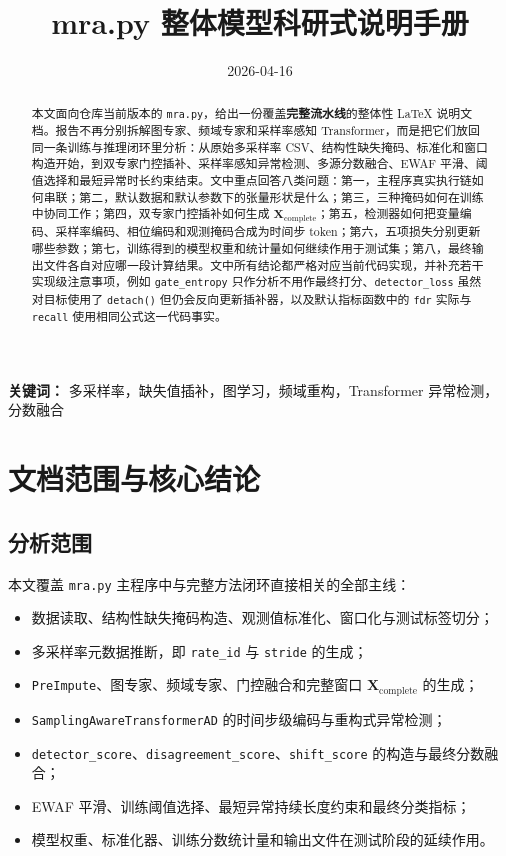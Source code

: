 \documentclass[UTF8]{ctexart}
\title{mra.py 整体模型科研式说明手册}
\author{}
\date{2026-04-16}
\newcommand{\code}[1]{\texttt{#1}}
\begin{document}
\maketitle

\begin{abstract}
本文面向仓库当前版本的 \code{mra.py}，给出一份覆盖\textbf{完整流水线}的整体性 LaTeX 说明文档。报告不再分别拆解图专家、频域专家和采样率感知 Transformer，而是把它们放回同一条训练与推理闭环里分析：从原始多采样率 CSV、结构性缺失掩码、标准化和窗口构造开始，到双专家门控插补、采样率感知异常检测、多源分数融合、EWAF 平滑、阈值选择和最短异常时长约束结束。文中重点回答八类问题：第一，主程序真实执行链如何串联；第二，默认数据和默认参数下的张量形状是什么；第三，三种掩码如何在训练中协同工作；第四，双专家门控插补如何生成 \(\bm{X}_{\text{complete}}\)；第五，检测器如何把变量编码、采样率编码、相位编码和观测掩码合成为时间步 token；第六，五项损失分别更新哪些参数；第七，训练得到的模型权重和统计量如何继续作用于测试集；第八，最终输出文件各自对应哪一段计算结果。文中所有结论都严格对应当前代码实现，并补充若干实现级注意事项，例如 \code{gate\_entropy} 只作分析不用作最终打分、\code{detector\_loss} 虽然对目标使用了 \code{detach()} 但仍会反向更新插补器，以及默认指标函数中的 \code{fdr} 实际与 \code{recall} 使用相同公式这一代码事实。
\end{abstract}

\noindent\textbf{关键词：} 多采样率，缺失值插补，图学习，频域重构，Transformer 异常检测，分数融合

\tableofcontents
\newpage

\section{文档范围与核心结论}

\subsection{分析范围}

本文覆盖 \code{mra.py} 主程序中与完整方法闭环直接相关的全部主线：
\begin{itemize}
    \item 数据读取、结构性缺失掩码构造、观测值标准化、窗口化与测试标签切分；
    \item 多采样率元数据推断，即 \code{rate\_id} 与 \code{stride} 的生成；
    \item \code{PreImpute}、图专家、频域专家、门控融合和完整窗口 \(\bm{X}_{\text{complete}}\) 的生成；
    \item \code{SamplingAwareTransformerAD} 的时间步级编码与重构式异常检测；
    \item \code{detector\_score}、\code{disagreement\_score}、\code{shift\_score} 的构造与最终分数融合；
    \item EWAF 平滑、训练阈值选择、最短异常持续长度约束和最终分类指标；
    \item 模型权重、标准化器、训练分数统计量和输出文件在测试阶段的延续作用。
\end{itemize}
\end{document}
